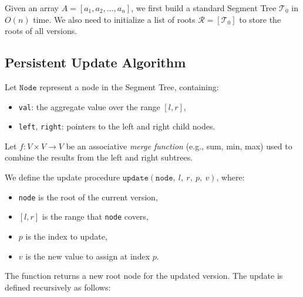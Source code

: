 \documentclass{fairmeta}
\numberwithin{equation}{section}
\begin{document}
Given an array $A = [a_1, a_2, \dots, a_n]$, we first build a standard Segment Tree $\mathcal{T}_0$ in $O(n)$ time. We also need to initialize a list of roots $\mathcal{R} = [\mathcal{T}_0]$ to store the roots of all versions.

\subsection{Persistent Update Algorithm}

Let $\texttt{Node}$ represent a node in the Segment Tree, containing:
\begin{itemize}
    \item \texttt{val}: the aggregate value over the range $[l, r]$,
    \item \texttt{left}, \texttt{right}: pointers to the left and right child nodes.
\end{itemize}

Let $f : V \times V \to V$ be an associative \emph{merge function} (e.g., sum, min, max) used to combine the results from the left and right subtrees.

We define the update procedure $\texttt{update}(\texttt{node},\ l,\ r,\ p,\ v)$, where:
\begin{itemize}
    \item \texttt{node} is the root of the current version,
    \item $[l, r]$ is the range that \texttt{node} covers,
    \item $p$ is the index to update,
    \item $v$ is the new value to assign at index $p$.
\end{itemize}

\vspace{0.5em}
\noindent The function returns a new root node for the updated version. The update is defined recursively as follows:
\end{document}
